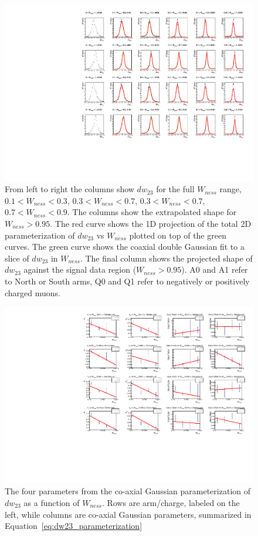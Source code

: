 \begin{figure}
  \centering
  \includegraphics[width=\linewidth]{./figures/dw23_extrap_bins.pdf}
  \caption{
    From left to right the columns show $dw_{23}$ for the full $W_{ness}$ range,
    $0.1 < W_{ness} < 0.3$, $0.3 < W_{ness} < 0.7$, $0.3 < W_{ness} < 0.7$, $0.7
    < W_{ness} < 0.9$. The columns show the extrapolated shape for $W_{ness} >
    0.95$. The red curve shows the 1D projection of the total 2D
    parameterization of $dw_{23}$ vs $W_{ness}$ plotted on top of the green
    curves. The green curve shows the coaxial double Gaussian fit to a slice of
    $dw_{23}$ in $W_{ness}$. The final column shows the projected shape of
    $dw_{23}$ against the signal data region ($W_{ness} > 0.95$). A0 and A1
    refer to North or South arms, Q0 and Q1 refer to negatively or positively
    charged muons.
  }
  \label{fig:dw23_slice_fits}
\end{figure}

\begin{figure}[ht]
  \centering
  \includegraphics[width=\linewidth]{./figures/dw23_parameters_linearized.pdf}
  \caption{
    The four parameters from the co-axial Gaussian parameterization of $dw_{23}$
    as a function of $W_{ness}$.  Rows are arm/charge, labeled on the left,
    while columns are co-axial Gaussian parameters, summarized in
    Equation~\ref{eq:dw23_parameterization}
  }
  \label{fig:coax_params_vs_wness}
\end{figure}

